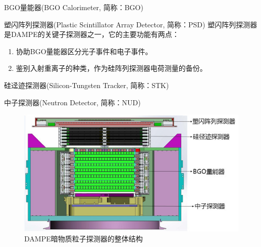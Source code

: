 BGO量能器(BGO Calorimeter, 简称：BGO)

塑闪阵列探测器(Plastic Scintillator Array Detector, 简称：PSD)
塑闪阵列探测器是DAMPE的关键子探测器之一，它的主要功能有两点：
\begin{enumerate}
	\item 协助BGO量能器区分光子事件和电子事件。
	\item 鉴别入射重离子的种类，作为硅阵列探测器电荷测量的备份。
\end{enumerate}

硅迳迹探测器(Silicon-Tungsten Tracker, 简称：STK)

中子探测器(Neutron Detector, 简称：NUD)

\begin{figure}
\centering
\includegraphics[width=0.8\linewidth]{chap/introduction/fig/dampe_structure_2}
\caption{DAMPE暗物质粒子探测器的整体结构}
\label{fig:dampe_structure}
\end{figure}
